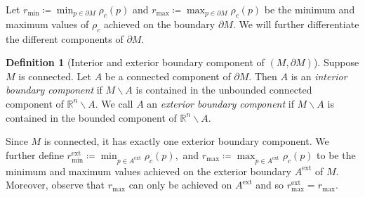 \documentclass[a4paper,11pt]{article}
\theoremstyle{definition}
\newtheorem{defn}[theorem]{Definition}  \newtheorem{ex}[theorem]{Example}  \newtheorem{exs}[theorem]{Examples}  \newtheorem{question}[theorem]{Question}
\newcommand{\R}{\mathbb{R}}
\begin{document}
Let $r_{\min} \coloneqq \min_{p\in \partial M}\rho_c(p)$ and $r_{\max}\coloneqq \max_{p\in \partial M}\rho_c(p)$ be the minimum and maximum values of $\rho_c$ achieved on the boundary $\partial M$. We will further differentiate the different components of $\partial M$.

\begin{defn}[Interior and exterior boundary component of $(M,\partial M)$]\label{bndComp}
Suppose $M$ is connected. Let $A$ be a connected component of $\partial M$. Then $A$ is an \emph{interior boundary component} if $M\backslash A$ is contained in the unbounded connected component of $\R^n\backslash A$. We call $A$ an \emph{exterior boundary component} if $M\backslash A$ is contained in the bounded component of $\R^n\backslash A$. 
\end{defn}

Since $M$ is connected, it has exactly one exterior boundary component. We further define $r_{\min}^\mathrm{ext}\coloneqq \min_{p\in A^{\mathrm{ext}}}\rho_c(p),$ and $r_{\max}\coloneqq \max_{p\in A^\mathrm{ext}}\rho_c(p)$ to be the minimum and maximum values achieved on the exterior boundary $A^{\mathrm{ext}}$ of $M$.
Moreover, observe that $r_{\max}$ can only be achieved on $A^\mathrm{ext}$ and so $r_{\max}^{\mathrm{ext}} = r_{\max}$. 
\end{document}
